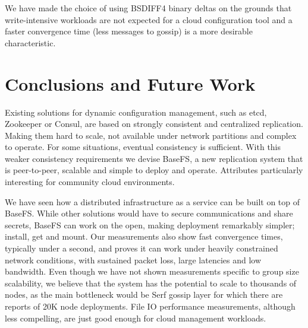 \documentclass{sig-alternate}
\begin{document}
We have made the choice of using BSDIFF4 binary deltas on the grounds that write-intensive workloads are not expected for a cloud configuration tool and a faster convergence time (less messages to gossip) is a more desirable characteristic.


\section{Conclusions and Future Work}

Existing solutions for dynamic configuration management, such as etcd, Zookeeper or Consul, are based on strongly consistent and centralized replication. Making them hard to scale, not available under network partitions and complex to operate. For some situations, eventual consistency is sufficient. With this weaker consistency requirements we devise BaseFS, a new replication system that is peer-to-peer, scalable and simple to deploy and operate. Attributes particularly interesting for community cloud environments.

We have seen how a distributed infrastructure as a service can be built on top of BaseFS. While other solutions would have to secure communications and share secrets, BaseFS can work on the open, making deployment remarkably simpler; install, get and mount. Our measurements also show fast convergence times, typically under a second, and proves it can work under heavily constrained network conditions, with sustained packet loss, large latencies and low bandwidth. Even though we have not shown measurements specific to group size scalability, we believe that the system has the potential to scale to thousands of nodes, as the main bottleneck would be Serf gossip layer for which there are reports of 20K node deployments. File IO performance measurements, although less compelling, are just good enough for cloud management workloads.
\end{document}

